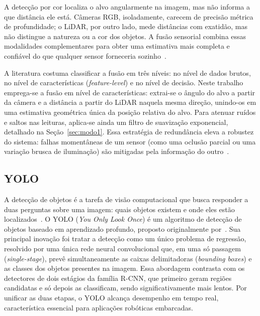 A detecção por cor localiza o alvo angularmente na imagem, mas não
informa a que distância ele está. Câmeras RGB, isoladamente, carecem de
precisão métrica de profundidade; o LiDAR, por outro lado, mede distâncias com
exatidão, mas não distingue a natureza ou a cor dos objetos. A
fusão sensorial combina essas modalidades complementares para obter uma
estimativa mais completa e confiável do que qualquer sensor forneceria
sozinho~\cite{zhang2019robust}.

A literatura costuma classificar a fusão em três níveis: no nível de dados brutos,
no nível de características (\textit{feature-level}) e no nível de decisão. Neste
trabalho emprega-se a fusão em nível de características: extrai-se o
ângulo do alvo a partir da câmera e a distância a partir do LiDAR naquela mesma
direção, unindo-os em uma estimativa geométrica única da posição relativa do
alvo. Para atenuar ruídos e saltos nas leituras, aplica-se ainda um filtro de
suavização exponencial, detalhado na Seção~\ref{sec:modo1}. Essa estratégia de
redundância eleva a robustez do sistema: falhas momentâneas de um sensor (como
uma oclusão parcial ou uma variação brusca de iluminação) são mitigadas pela
informação do outro~\cite{nguyen2020lidar}.

\subsection{YOLO}

A detecção de objetos é a tarefa de visão computacional que busca responder a duas
perguntas sobre uma imagem: quais objetos existem e onde eles
estão localizados~\cite{zou2023survey}. O YOLO (\textit{You Only Look Once}) é um
algoritmo de detecção de objetos baseado em aprendizado profundo, proposto
originalmente por~\cite{redmon2016yolo}. Sua
principal inovação foi tratar a detecção como um único problema de regressão,
resolvido por uma única rede neural convolucional que, em uma só passagem
(\textit{single-stage}), prevê simultaneamente as caixas delimitadoras
(\textit{bounding boxes}) e as classes dos objetos presentes na imagem. Essa
abordagem contrasta com os detectores de dois estágios da família R-CNN, que
primeiro geram regiões candidatas e só depois as classificam, sendo
significativamente mais lentos. Por unificar as duas etapas, o YOLO alcança
desempenho em tempo real, característica essencial para aplicações robóticas
embarcadas.

